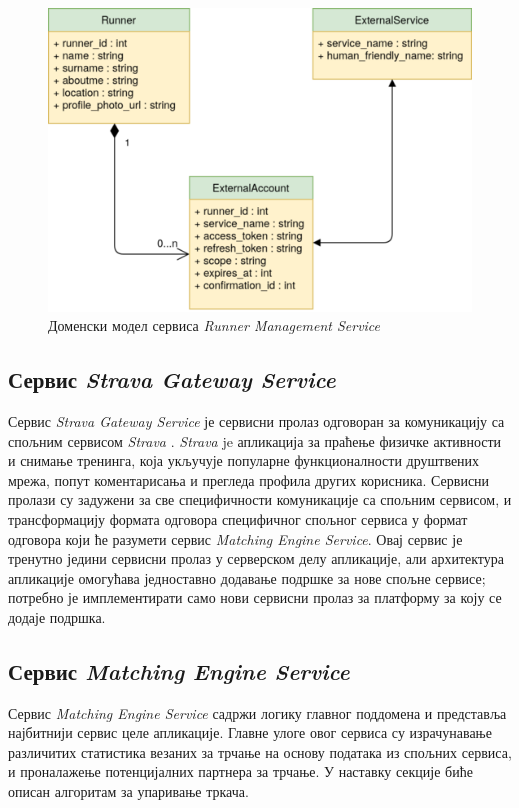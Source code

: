 \documentclass[12pt,oneside]{memoir}
\begin{document}
\begin{figure}[!ht]
  \centering
  \includegraphics[scale=0.7]{slike/runner-management-service-model.png}
  \caption{Доменски модел сервиса \textit{Runner Management Service}}
  \label{fig:runner-management-service-model}
\end{figure}

\subsection{Сервис \textit{Strava Gateway Service}}
Сервис \textit{Strava Gateway Service} је сервисни пролаз одговоран за комуникацију са спољним сервисом \textit{Strava} \cite{stravaapi}. \textit{Strava} je апликација за праћење физичке активности и снимање тренинга, која укључује популарне функционалности друштвених мрежа, попут коментарисања и прегледа профила других корисника. Сервисни пролази су задужени за све специфичности комуникације са спољним сервисом, и трансформацију формата одговора специфичног спољног сервиса у формат одговора који ће разумети сервис \textit{Matching Engine Service}. Овај сервис је тренутно једини сервисни пролаз у серверском делу апликације, али архитектура апликације омогућава једноставно додавање подршке за нове спољне сервисе; потребно је имплементирати само нови сервисни пролаз за платформу за коју се додаје подршка.

\subsection{Сервис \textit{Matching Engine Service}}
Сервис \textit{Matching Engine Service} садржи логику главног поддомена и представља најбитнији сервис целе апликације. Главне улоге овог сервиса су израчунавање различитих статистика везаних за трчање на основу података из спољних сервиса, и проналажење потенцијалних партнера за трчање. У наставку секције биће описан алгоритам за упаривање тркача.
\end{document}

